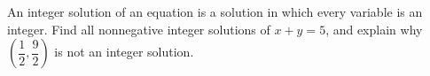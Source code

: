 An integer solution of an equation is a solution in which every variable is an integer. Find all nonnegative integer solutions of $x+y=5$, and explain why $(\dfrac{1}{2},\dfrac{9}{2})$ is not an integer solution.
